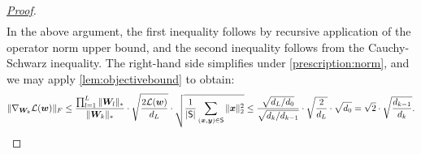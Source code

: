 \begin{proof}[\mbox{\hyperref[lem:gradientbound]{Proof}}]
\begin{align*}
\end{align*}
In the above argument, the first inequality follows by recursive application of the operator norm upper bound, and the second inequality follows from the Cauchy-Schwarz inequality. The right-hand side simplifies under \cref{prescription:norm}, and we may apply \cref{lem:objectivebound} to obtain:
\begin{align*}
    \Vert {\nabla_{{\bm{W}}_k} \mathcal{L}({\bm{w}})} \Vert_F \leq \frac{\prod_{l=1}^L\Vert {{\bm{W}}_l} \Vert_*}{\Vert {{\bm{W}}_k} \Vert_*} \cdot \sqrt{\frac{2\mathcal{L}({\bm{w}})}{d_L}} \cdot \sqrt{\frac{1}{\vert {\mathsf{S}} \vert} \sum_{({\bm{x}},{\bm{y}})\in \mathsf{S}}\Vert {{\bm{x}}} \Vert_2^2} \leq \frac{\sqrt{d_L/d_0}}{\sqrt{d_k / d_{k-1}}} \cdot \sqrt{\frac{2}{d_L}}\cdot \sqrt{d_0} = \sqrt{2}\cdot \sqrt{\frac{d_{k-1}}{d_k}}.
\end{align*}
\end{proof}

